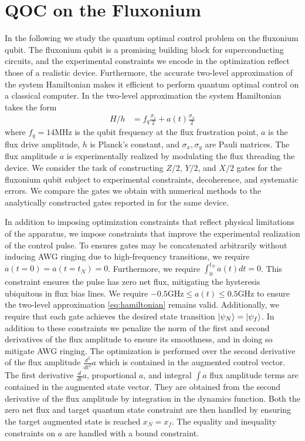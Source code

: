 \section{QOC on the Fluxonium}
In the following we study
the quantum optimal control problem on the fluxonium qubit.
The fluxonium qubit is a promising building block for superconducting
circuits, and the experimental constraints we encode in the optimization reflect
those of a realistic device. Furthermore, the accurate
two-level approximation of the system Hamiltonian makes it
efficient to perform quantum optimal control on
a classical computer. In the two-level
approximation the system Hamiltonian takes the form
\label{eq:hamiltonian}
\begin{align}
  H/h &= f_{q} \frac{\sigma_{z}}{2} + a(t) \frac{\sigma_{x}}{2}
\end{align}
where $f_{q} = 14$MHz is the qubit frequency at the flux frustration point,
$a$ is the flux drive amplitude, $h$ is Planck's constant, and $\sigma_{x}, \sigma_{y}$
are Pauli matrices. The flux amplitude $a$ is experimentally
realized by modulating the flux 
threading the device. We consider the task of constructing $Z/2$, $Y/2$, and $X/2$
gates for the fluxonium qubit subject to experimental constraints, decoherence, and
systematic errors. We compare the gates we obtain with numerical
methods to the analytically constructed gates reported in
\cite{zhang2020universal} for the same device.

In addition to imposing optimization constraints that
reflect physical limitations of the apparatus, we impose
constraints that improve the experimental realization of the control pulse.
To ensures gates may be concatenated arbitrarily without
inducing AWG ringing due to high-frequency transitions,
we require $a(t = 0) = a(t = t_{N}) = 0$.
Furthermore, we require $\int_{0}^{t_{N}} a(t) dt = 0$. This
constraint ensures the pulse has zero net flux, mitigating
the hysteresis ubiquitous in flux bias lines.
We require $-0.5 \textrm{GHz} \le a(t) \le 0.5 \textrm{GHz}$
to ensure the two-level approximation \ref{eq:hamiltonian}
remains valid. Additionally, we require that each gate achieves
the desired state transition $\ket{\psi_{N}} = \ket{\psi_{f}}$.
In addition to these constraints we penalize the norm
of the first and second derivatives of the flux amplitude to
ensure its smoothness, and in doing so mitigate AWG ringing.
The optimization is performed over the second derivative of the flux amplitude
$\frac{d^{2}}{dt^{2}} a$ which is contained in the
augmented control vector. The first derivative
$\frac{d}{dt} a$, proportional $a$, and integral $\int a$
flux amplitude terms
are contained in the augmented state vector. They are obtained from
the second derivative of the flux amplitude by
integration in the dynamics function.
Both the zero net flux and target quantum state constraint
are then handled by ensuring the target augmented state is
reached $x_{N} = x_{f}$.
The equality and inequality constraints on $a$ are handled
with a bound constraint.

